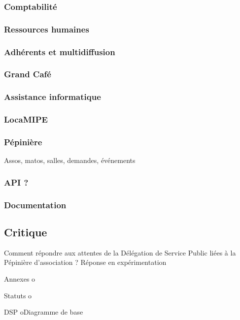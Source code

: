 \documentclass[a4wide,10pt,2pages]{article}
\begin{document}
\subsubsection{Comptabilité}
\subsubsection{Ressources humaines}
\subsubsection{Adhérents et multidiffusion}
\subsubsection{Grand Café}
\subsubsection{Assistance informatique}
\subsubsection{LocaMIPE}
\subsubsection{Pépinière}
Assos, matos, salles, demandes, événements
\subsubsection{API ?}
\subsubsection{Documentation}
\subsection{Critique}
Comment répondre aux attentes de la Délégation de Service Public liées à la Pépinière d'association ?
            Réponse en expérimentation
	
Annexes
          o

            Statuts
          o

            DSP
          oDiagramme de base
\end{document}
